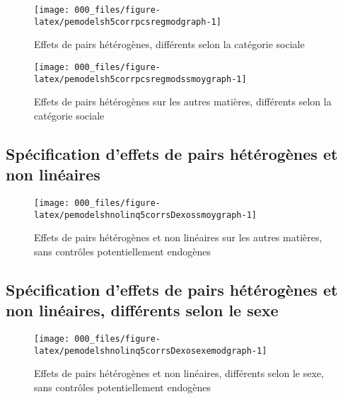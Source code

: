 \documentclass[
]{book}
\begin{document}
\begin{figure}[H]

{\centering \texttt{[image: 000\_files/figure-latex/pemodelsh5corrpcsregmodgraph-1]} 

}

\caption{Effets de pairs hétérogènes, différents selon la catégorie sociale}\label{fig:pemodelsh5corrpcsregmodgraph}
\end{figure}

\begin{figure}[H]

{\centering \texttt{[image: 000\_files/figure-latex/pemodelsh5corrpcsregmodssmoygraph-1]} 

}

\caption{Effets de pairs hétérogènes sur les autres matières, différents selon la catégorie sociale}\label{fig:pemodelsh5corrpcsregmodssmoygraph}
\end{figure}

\hypertarget{pemodelshnolinq5corrssmoy}{%
\subsection{Spécification d'effets de pairs hétérogènes et non linéaires}\label{pemodelshnolinq5corrssmoy}}

\begin{figure}[H]

{\centering \texttt{[image: 000\_files/figure-latex/pemodelshnolinq5corrsDexossmoygraph-1]} 

}

\caption{Effets de pairs hétérogènes et non linéaires sur les autres matières, sans contrôles potentiellement endogènes}\label{fig:pemodelshnolinq5corrsDexossmoygraph}
\end{figure}

\hypertarget{pemodelshnolinq5corrsexemodssmoy}{%
\subsection{Spécification d'effets de pairs hétérogènes et non linéaires, différents selon le sexe}\label{pemodelshnolinq5corrsexemodssmoy}}

\begin{figure}[H]

{\centering \texttt{[image: 000\_files/figure-latex/pemodelshnolinq5corrsDexosexemodgraph-1]} 

}

\caption{Effets de pairs hétérogènes et non linéaires, différents selon le sexe, sans contrôles potentiellement endogènes}\label{fig:pemodelshnolinq5corrsDexosexemodgraph}
\end{figure}
\end{document}
